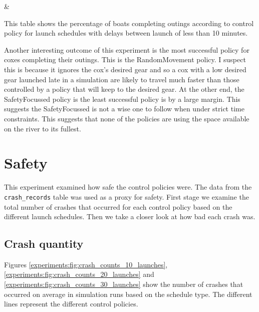   \begin{table}[h]
  \centering
  {\cp & \landed}
  \caption{This table shows the percentage of boats completing outings according to control policy for launch schedules with delays between launch of less than 10 minutes.}
  \label{experiments:tab:returning_boats_by_policy_small_delay}
  \end{table}
  
  Another interesting outcome of this experiment is the most successful policy for coxes completing their outings. This is the RandomMovement policy. I suspect this is because it ignores the cox's desired gear and so a cox with a low desired gear launched late in a simulation are likely to travel much faster than those controlled by a policy that will keep to the desired gear. At the other end, the SafetyFocussed policy is the least successful policy is by a large margin. This suggests the SafetyFocussed is not a wise one to follow when under strict time constraints. This suggests that none of the policies are using the space available on the river to its fullest.
  
\section{Safety}
This experiment examined how safe the control policies were. The data from the \texttt{crash\_records} table was used as a proxy for safety. First stage we examine the total number of crashes that occurred for each control policy based on the different launch schedules. Then we take a closer look at how bad each crash was.
  
  \subsection{Crash quantity}
  Figures \ref{experiments:fig:crash_counts_10_launches}, \ref{experiments:fig:crash_counts_20_launches} and \ref{experiments:fig:crash_counts_30_launches} show the number of crashes that occurred on average in simulation runs based on the schedule type. The different lines represent the different control policies.
  
